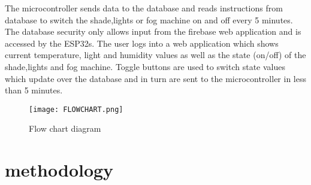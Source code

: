 \documentclass[conference]{IEEEtran}
\begin{document}

The microcontroller sends data to the database and reads instructions from database to switch the shade,lights or fog machine on and off every 5 minutes. The database security only allows input from the firebase web application and is accessed by the ESP32s. The user logs into a web application which shows current temperature, light and humidity values as well as the state (on/off) of the shade,lights and fog machine. Toggle buttons are used to switch state values which update over the database and in turn are sent to the microcontroller in less than 5 minutes.
\begin{figure}
    \begin{center}
        \texttt{[image: FLOWCHART.png]}
        \caption{\large Flow chart diagram}
    \end{center}
\end{figure}

\section{methodology}
\end{document}
